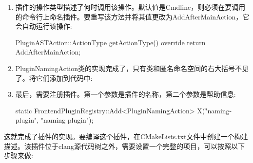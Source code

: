 \begin{enumerate}
\item
插件的操作类型描述了何时调用该操作。默认值是Cmdline，则必须在要调用的命令行上命名插件。要重写该方法并将其值更改为AddAfterMainAction，它会自动运行该操作:

\begin{cpp}
    PluginASTAction::ActionType getActionType() override {
        return AddAfterMainAction;
    }
\end{cpp}

\item
PluginNamingAction类的实现完成了，只有类和匿名命名空间的右大括号不见了。将它们添加到代码中:

\begin{cpp}
};
}
\end{cpp}

\item
最后，需要注册插件。第一个参数是插件的名称，第二个参数是帮助信息:

\begin{cpp}
static FrontendPluginRegistry::Add<PluginNamingAction> X("naming-plugin",       "naming plugin");
\end{cpp}
\end{enumerate}

这就完成了插件的实现。要编译这个插件，在CMakeLists.txt文件中创建一个构建描述。该插件位于clang源代码树之外，需要设置一个完整的项目，可以按照以下步骤来做:


